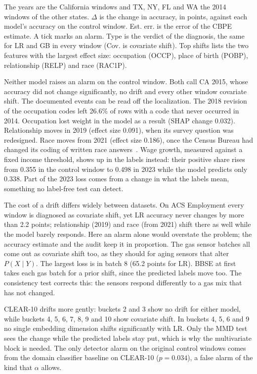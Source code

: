 \documentclass[pdflatex,referee,lineno,sn-basic]{sn-jnl}
\begin{document}
The years are the California windows and TX, NY, FL and WA the 2014 windows of the other states. $\Delta$ is the change in accuracy, in points, against each model's accuracy on the control window. Est. err. is the error of the CBPE estimate. A tick marks an alarm. Type is the verdict of the diagnosis, the same for LR and GB in every window (Cov. is covariate shift). Top shifts lists the two features with the largest effect size: occupation (OCCP), place of birth (POBP), relationship (RELP) and race (RAC1P).

Neither model raises an alarm on the control window. Both call CA 2015, whose accuracy did not change significantly, no drift and every other window covariate shift. The documented events can be read off the localization. The 2018 revision of the occupation codes left 26.6\% of rows with a code that never occurred in 2014. Occupation lost weight in the model as a result (SHAP change \textminus{}0.032). Relationship moves in 2019 (effect size 0.091), when its survey question was redesigned. Race moves from 2021 (effect size 0.186), once the Census Bureau had changed its coding of written race answers~\citep{census2021race}. Wage growth, measured against a fixed income threshold, shows up in the labels instead: their positive share rises from 0.355 in the control window to 0.498 in 2023 while the model predicts only 0.338. Part of the 2023 loss comes from a change in what the labels mean, something no label-free test can detect.

The cost of a drift differs widely between datasets. On ACS Employment every window is diagnosed as covariate shift, yet LR accuracy never changes by more than 2.2 points; relationship (2019) and race (from 2021) shift there as well while the model barely responds. Here an alarm alone would overstate the problem; the accuracy estimate and the audit keep it in proportion. The gas sensor batches all come out as covariate shift too, as they should for aging sensors that alter $P(X\mid Y)$. The largest loss is in batch 8 (\textminus{}65.2 points for LR). BBSE at first takes each gas batch for a prior shift, since the predicted labels move too. The consistency test corrects this: the sensors respond differently to a gas mix that has not changed.

CLEAR-10 drifts more gently: buckets 2 and 3 show no drift for either model, while buckets 4, 5, 6, 7, 8, 9 and 10 show covariate shift. In buckets 4, 5, 6 and 9 no single embedding dimension shifts significantly with LR. Only the MMD test sees the change while the predicted labels stay put, which is why the multivariate block is needed. The only detector alarm on the original control windows comes from the domain classifier baseline on CLEAR-10 ($p=0.034$), a false alarm of the kind that $\alpha$ allows.
\end{document}
